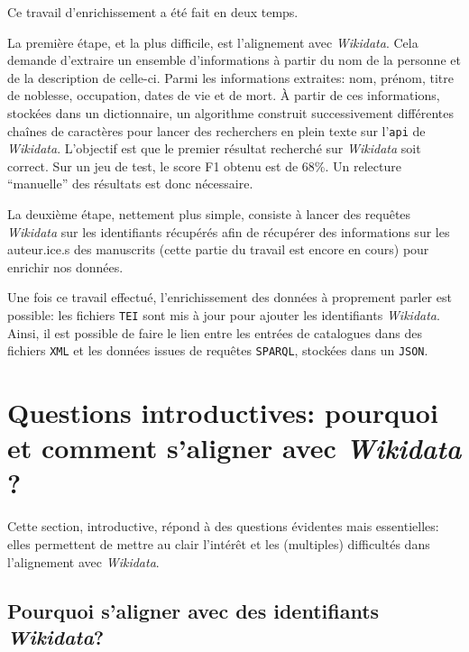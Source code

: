 \documentclass[a4paper, 12pt, twoside]{book}
\newcommand{\scl}[1]{%
	#1%
	\ifthenelse{\equal{#1}{I}}{\up{er}}{\up{ème}}%
	~s.%
}
\newcommand{\api}{\texttt{\gls{api}}}
\newcommand{\json}{\texttt{JSON}}
\newcommand{\sparql}{\texttt{\gls{SPARQL}}}
\newcommand{\tei}{\texttt{TEI}}
\newcommand{\xml}{\texttt{XML}}
\newcommand{\wkd}{\textit{Wikidata}}
\begin{document}
Ce travail d'enrichissement a été fait en deux temps. 

La première étape, et la plus difficile, est l'alignement avec \wkd{}. Cela demande d'extraire un ensemble d'informations à partir du nom de la personne et de la description de celle-ci. Parmi les informations extraites: nom, prénom, titre de noblesse, occupation, dates de vie et de mort. À partir de ces informations, stockées dans un dictionnaire, un algorithme construit successivement différentes chaînes de caractères pour lancer des recherchers en plein texte sur l'\api{} de \wkd{}. L'objectif est que le premier résultat recherché sur \wkd{} soit correct. Sur un jeu de test, le \gls{score F1} obtenu est de 68\%. Un relecture \enquote{manuelle} des résultats est donc nécessaire.

La deuxième étape, nettement plus simple, consiste à lancer des requêtes \wkd{} sur les identifiants récupérés afin de récupérer des informations sur les auteur.ice.s des manuscrits (cette partie du travail est encore en cours) pour enrichir nos données.

Une fois ce travail effectué, l'enrichissement des données à proprement parler est possible: les fichiers \tei{} sont mis à jour pour ajouter les identifiants \wkd{}. Ainsi, il est possible de faire le lien entre les entrées de catalogues dans des fichiers \xml{} et les données issues de requêtes \sparql{}, stockées dans un \json.


\section{Questions introductives: pourquoi et comment s'aligner avec \wkd{} ?}
Cette section, introductive, répond à des questions évidentes mais essentielles: elles permettent de mettre au clair l'intérêt et les (multiples) difficultés dans l'alignement avec \wkd{}.

\subsection{Pourquoi s'aligner avec des identifiants \wkd{}?} 
\end{document}
